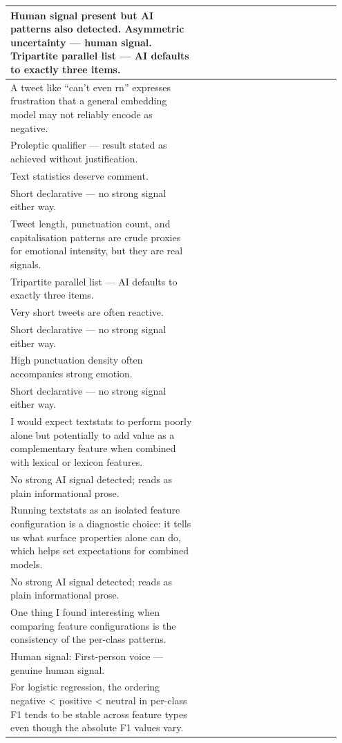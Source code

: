 \documentclass[11pt]{article}
\begin{document}
\begin{longtable}{|p{0.55\linewidth}|p{0.40\linewidth}|}
\hline
Human signal present but AI patterns also detected. Asymmetric uncertainty --- human signal. Tripartite parallel list --- AI defaults to exactly three items. & \\
\hline
A tweet like ``can't even rn'' expresses frustration that a general embedding model may not reliably encode as negative. & \\[2pt]
\hline
Proleptic qualifier --- result stated as achieved without justification. & \\
\hline
Text statistics deserve comment. & \\[2pt]
\hline
Short declarative --- no strong signal either way. & \\
\hline
Tweet length, punctuation count, and capitalisation patterns are crude proxies for emotional intensity, but they are real signals. & \\[2pt]
\hline
Tripartite parallel list --- AI defaults to exactly three items. & \\
\hline
Very short tweets are often reactive. & \\[2pt]
\hline
Short declarative --- no strong signal either way. & \\
\hline
High punctuation density often accompanies strong emotion. & \\[2pt]
\hline
Short declarative --- no strong signal either way. & \\
\hline
I would expect textstats to perform poorly alone but potentially to add value as a complementary feature when combined with lexical or lexicon features. & \\[2pt]
\hline
No strong AI signal detected; reads as plain informational prose. & \\
\hline
Running textstats as an isolated feature configuration is a diagnostic choice: it tells us what surface properties alone can do, which helps set expectations for combined models. & \\[2pt]
\hline
No strong AI signal detected; reads as plain informational prose. & \\
\hline
One thing I found interesting when comparing feature configurations is the consistency of the per-class patterns. & \\[2pt]
\hline
Human signal: First-person voice --- genuine human signal. & \\
\hline
For logistic regression, the ordering negative < positive < neutral in per-class F1 tends to be stable across feature types even though the absolute F1 values vary. & \\[2pt]

\end{longtable}
\end{document}
